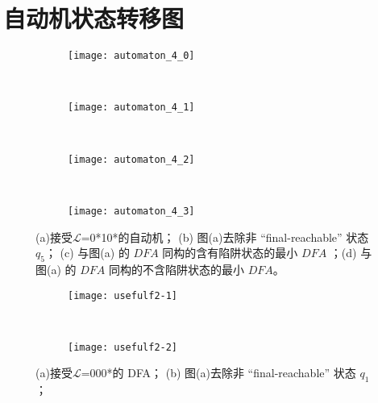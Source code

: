 \chapter{自动机状态转移图}


\begin{figure}[!htbp]
    \centering
    \begin{subfigure}[b]{0.35\textwidth}
        \texttt{[image: automaton\_4\_0]}
        \caption{}
        \label{fig:DFA4_0}
    \end{subfigure}
    ~
    \begin{subfigure}[b]{0.35\textwidth}
        \texttt{[image: automaton\_4\_1]}
        \caption{}
        \label{fig:DFA4_1}
    \end{subfigure}
    \\
    \begin{subfigure}[b]{0.35\textwidth}
        \texttt{[image: automaton\_4\_2]}
        \caption{}
        \label{fig:DFA4_2}
    \end{subfigure}
    ~
    \begin{subfigure}[b]{0.35\textwidth}
        \texttt{[image: automaton\_4\_3]}
        \caption{}
        \label{fig:DFA4_3}
    \end{subfigure}
    \caption{(a)接受{$\mathcal{L}$}=0*10*的自动机{\cite[fig 5-4]{book1}}；  (b) 图(a)去除非 “final-reachable” 状态 {$q_5$}； (c) 与图(a) 的 $DFA$ 同构的含有陷阱状态的最小 $DFA$ ；(d) 与图(a) 的 $DFA$ 同构的不含陷阱状态的最小 $DFA$。}
    \label{fig:DFA4}
\end{figure}


\begin{figure}[!htbp]
  \centering
  \begin{subfigure}[b]{0.35\textwidth}
      \texttt{[image: usefulf2-1]}
      \caption{}
      \label{fig:usefulf2-1}
  \end{subfigure}
  ~
  \begin{subfigure}[b]{0.35\textwidth}
      \texttt{[image: usefulf2-2]}
      \caption{}
      \label{fig:usefulf2-2}
  \end{subfigure}
  \caption{(a)接受{$\mathcal{L}$}=000*的 DFA；  (b) 图(a)去除非 “final-reachable” 状态 {$q_1$}； }
  \label{fig:usefulf2-0}
\end{figure}


